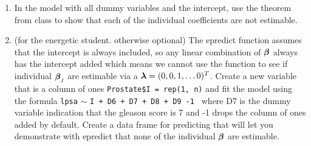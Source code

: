 \documentclass{article}
\begin{document}
\begin{enumerate}
\item In the model with all dummy variables and the intercept, use the
  theorem from class to show that each of the individual coefficients
  are not estimable. 

\item (for the energetic student. otherwise optional)  The epredict function assumes that
  the intercept is always included, so any linear combination of $\boldsymbol{\beta}$
  always has the intercept added which means we cannot use the
  function to see if individual $\boldsymbol{\beta}_j$ are estimable via a $\boldsymbol{\lambda} =
  (0, 0, 1, \ldots 0)^T$. Create a new variable that is a
  column of ones {\tt Prostate\$I = rep(1, n)} and fit the model 
  using the formula {\tt lpsa} $\sim$ {\tt I + D6 + D7  + D8 + D9 -1 }
  where D7 is the dummy variable indication that the gleason score is
  7 and -1 drops the column of ones added by default.    Create a data
  frame for predicting that will let you demonstrate with epredict that none of the
  individual $\boldsymbol{\beta}$ are estimable.

\end{enumerate}
\end{document}
